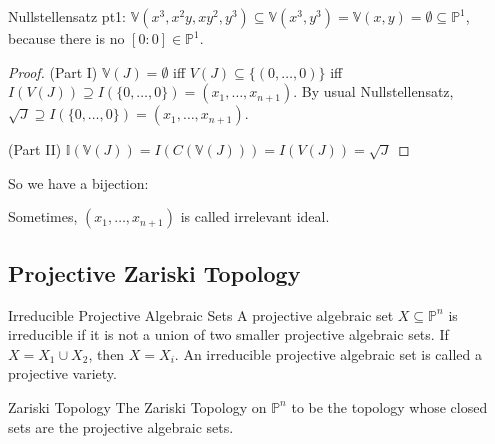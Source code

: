 \documentclass{report}
\begin{document}
\begin{examples}
    \begin{example}
        Nullstellensatz pt1: $\mathbb{V}(x^{3}, x^{2}y, xy^{2}, y^{3}) \subseteq \mathbb{V}(x^{3}, y^{3}) = \mathbb{V}(x, y) = \emptyset \subseteq \mathbb{P}^{1}$, because there is no $[0 : 0] \in \mathbb{P}^{1}$.
    \end{example}
\end{examples}

\begin{proof}
    (Part I) $\mathbb{V}(J) = \emptyset$ iff $V(J) \subseteq \{(0, \ldots, 0)\}$ iff $I(V(J)) \supseteq I(\{0, \ldots,0\}) = (x_{1}, \ldots, x_{n + 1})$. By usual Nullstellensatz, $\sqrt{J}  \supseteq I(\{0, \ldots, 0\}) = (x_{1}, \ldots, x_{n + 1})$.

    (Part II) $\mathbb{I}(\mathbb{V}(J)) = I(C(\mathbb{V}(J))) = I(V(J)) = \sqrt{J}$
\end{proof}

So we have a bijection: 
    \begin{center}
    \end{center}

Sometimes, $(x_{1}, \ldots, x_{n + 1})$ is called irrelevant ideal.

\begin{topic}
    \section{Projective Zariski Topology}
\end{topic}

\begin{definition}{Irreducible Projective Algebraic Sets}
    A projective algebraic set $X \subseteq \mathbb{P}^{n}$ is irreducible if it is not a union of two smaller projective algebraic sets. If $X = X_{1} \cup X_{2}$, then $X = X_{i}$. An irreducible projective algebraic set is called a projective variety.
\end{definition}

\begin{definition}{Zariski Topology}
    The Zariski Topology on $\mathbb{P}^{n}$ to be the topology whose closed sets are the projective algebraic sets.
\end{definition}
\end{document}
